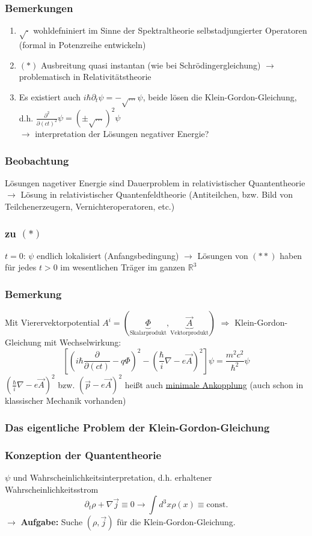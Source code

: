 \documentclass[twoside,a4paper]{scrartcl}
\newcommand{\R}{\mathbb{R}}
\renewcommand{\1}{\mathds{1}}
\newcommand{\Ra}{\Rightarrow}
\newcommand{\ra}{\rightarrow}
\renewcommand{\R}{\mathbb{R}}
\begin{document}
\subsubsection*{Bemerkungen}
\begin{enumerate}
\item $\sqrt{\cdot}$ wohldefniniert im Sinne der Spektraltheorie selbstadjungierter Operatoren (formal in Potenzreihe entwickeln)
\item $(*)$ Ausbreitung quasi instantan (wie bei Schrödingergleichung) $\ra$ problematisch in Relativitätstheorie
\item Es existiert auch $i\hbar \partial_t \psi=-\sqrt{...}\psi$, beide lösen die Klein-Gordon-Gleichung, d.h. $\frac{\partial^2}{\partial (ct)^2}\psi=(\pm \sqrt{...})^2 \psi$\\
$\ra$ interpretation der Lösungen negativer Energie?
\end{enumerate}
\subsubsection*{Beobachtung}
Lösungen nagetiver Energie sind Dauerproblem in relativistischer Quantentheorie $\ra$ Lösung in relativistischer Quantenfeldtheorie (Antiteilchen, bzw. Bild von Teilchenerzeugern, Vernichteroperatoren, etc.)
\subsubsection*{zu $(*)$}
$t=0$: $\psi$ endlich lokalisiert (Anfangsbedingung) $\ra$ Lösungen von $(**)$ haben für jedes $t>0$ im wesentlichen Träger im ganzen $\R^3$
\subsubsection*{Bemerkung}
Mit Vierervektorpotential $A^i=(\underbrace{\Phi}_{\mathrm{Skalarprodukt}},\underbrace{\vec A}_{\mathrm{Vektorprodukt}})$ $\Ra$ Klein-Gordon-Gleichung mit Wechselwirkung:
$$[(i\hbar \frac{\partial}{\partial (ct)}-q \Phi)^2-(\frac{\hbar}{i}\nabla -e \vec A)^2]\psi=\frac{m^2c^2}{\hbar^2}\psi$$
$(\frac{\hbar}{i}\nabla -e \vec A)^2$ bzw. $(\vec p-e \vec A)^2$ heißt auch \underline{minimale Ankopplung} (auch schon in klassischer Mechanik vorhanden)

\subsubsection*{Das eigentliche Problem der Klein-Gordon-Gleichung}
\subsubsection*{Konzeption der Quantentheorie}
$\psi$ und Wahrscheinlichkeitsinterpretation, d.h. erhaltener Wahrscheinlichkeitsstrom 
$$\partial_t \rho+\nabla \vec j\equiv 0 \ra \int d^3x \rho(x)\equiv \mathrm{const.}$$
$\ra$ \textbf{Aufgabe:} Suche $(\rho,\vec j)$ für die Klein-Gordon-Gleichung.
\end{document}
